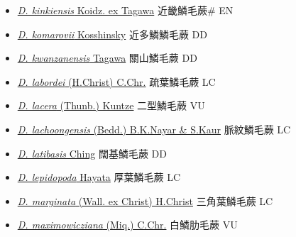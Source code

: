 \begin{itemize}
\begin{itemize}
        \item[] \href{http://www.theplantlist.org/tpl1.1/search?q=Dryopteris+kinkiensis}{\textit{D. kinkiensis} Koidz. ex Tagawa}   近畿鱗毛蕨\# EN
        \item[] \href{http://www.theplantlist.org/tpl1.1/search?q=Dryopteris+komarovii}{\textit{D. komarovii} Kosshinsky}   近多鱗鱗毛蕨 DD
        \item[] \href{http://www.theplantlist.org/tpl1.1/search?q=Dryopteris+kwanzanensis}{\textit{D. kwanzanensis} Tagawa}   關山鱗毛蕨 DD
        \item[] \href{http://www.theplantlist.org/tpl1.1/search?q=Dryopteris+labordei}{\textit{D. labordei} (H.Christ) C.Chr.}   疏葉鱗毛蕨 LC
        \item[] \href{http://www.theplantlist.org/tpl1.1/search?q=Dryopteris+lacera}{\textit{D. lacera} (Thunb.) Kuntze}   二型鱗毛蕨 VU
        \item[] \href{http://www.theplantlist.org/tpl1.1/search?q=Dryopteris+lachoongensis}{\textit{D. lachoongensis} (Bedd.) B.K.Nayar \& S.Kaur}   脈紋鱗毛蕨 LC
        \item[] \href{http://www.theplantlist.org/tpl1.1/search?q=Dryopteris+latibasis}{\textit{D. latibasis} Ching}   闊基鱗毛蕨 DD
        \item[] \href{http://www.theplantlist.org/tpl1.1/search?q=Dryopteris+lepidopoda}{\textit{D. lepidopoda} Hayata}   厚葉鱗毛蕨 LC
        \item[] \href{http://www.theplantlist.org/tpl1.1/search?q=Dryopteris+marginata}{\textit{D. marginata} (Wall. ex Christ) H.Christ}   三角葉鱗毛蕨 LC
        \item[] \href{http://www.theplantlist.org/tpl1.1/search?q=Dryopteris+maximowicziana}{\textit{D. maximowicziana} (Miq.) C.Chr.}     白鱗肋毛蕨 VU

\end{itemize}
\end{itemize}
